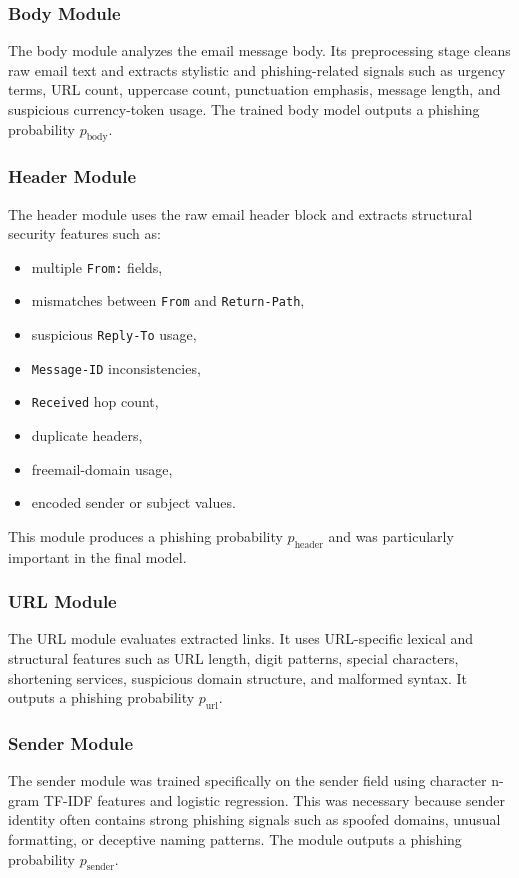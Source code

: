 \subsubsection{Body Module}
The body module analyzes the email message body. Its preprocessing stage cleans raw email text and extracts stylistic and phishing-related signals such as urgency terms, URL count, uppercase count, punctuation emphasis, message length, and suspicious currency-token usage. The trained body model outputs a phishing probability $p_{\text{body}}$.

\subsubsection{Header Module}
The header module uses the raw email header block and extracts structural security features such as:
\begin{itemize}
  \item multiple \texttt{From:} fields,
  \item mismatches between \texttt{From} and \texttt{Return-Path},
  \item suspicious \texttt{Reply-To} usage,
  \item \texttt{Message-ID} inconsistencies,
  \item \texttt{Received} hop count,
  \item duplicate headers,
  \item freemail-domain usage,
  \item encoded sender or subject values.
\end{itemize}

This module produces a phishing probability $p_{\text{header}}$ and was particularly important in the final model.

\subsubsection{URL Module}
The URL module evaluates extracted links. It uses URL-specific lexical and structural features such as URL length, digit patterns, special characters, shortening services, suspicious domain structure, and malformed syntax. It outputs a phishing probability $p_{\text{url}}$.

\subsubsection{Sender Module}
The sender module was trained specifically on the sender field using character n-gram TF-IDF features and logistic regression. This was necessary because sender identity often contains strong phishing signals such as spoofed domains, unusual formatting, or deceptive naming patterns. The module outputs a phishing probability $p_{\text{sender}}$.

